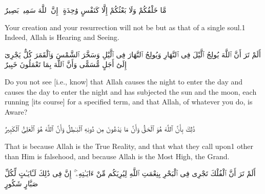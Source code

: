\begin{edition*}
	\begin{Arabic}
		مَّا خَلْقُكُمْ وَلَا بَعْثُكُمْ إِلَّا كَنَفْسٍ وَٰحِدَةٍ ۗ إِنَّ ٱللَّهَ سَمِيعٌۢ بَصِيرٌ
	\end{Arabic}
\end{edition*}

\begin{translation}
	Your creation and your resurrection will not be but as that of a single soul.1 Indeed, Allah is Hearing and Seeing.
\end{translation}


\begin{edition*}
	\begin{Arabic}
		أَلَمْ تَرَ أَنَّ ٱللَّهَ يُولِجُ ٱلَّيْلَ فِى ٱلنَّهَارِ وَيُولِجُ ٱلنَّهَارَ فِى ٱلَّيْلِ وَسَخَّرَ ٱلشَّمْسَ وَٱلْقَمَرَ كُلٌّ يَجْرِىٓ إِلَىٰٓ أَجَلٍ مُّسَمًّى وَأَنَّ ٱللَّهَ بِمَا تَعْمَلُونَ خَبِيرٌ
	\end{Arabic}
\end{edition*}

\begin{translation}
	Do you not see [i.e., know] that Allah causes the night to enter the day and causes the day to enter the night and has subjected the sun and the moon, each running [its course] for a specified term, and that Allah, of whatever you do, is Aware?
\end{translation}


\begin{edition*}
	\begin{Arabic}
		ذَٰلِكَ بِأَنَّ ٱللَّهَ هُوَ ٱلْحَقُّ وَأَنَّ مَا يَدْعُونَ مِن دُونِهِ ٱلْبَـٰطِلُ وَأَنَّ ٱللَّهَ هُوَ ٱلْعَلِىُّ ٱلْكَبِيرُ
	\end{Arabic}
\end{edition*}

\begin{translation}
	That is because Allah is the True Reality, and that what they call upon1 other than Him is falsehood, and because Allah is the Most High, the Grand.
\end{translation}


\begin{edition*}
	\begin{Arabic}
		أَلَمْ تَرَ أَنَّ ٱلْفُلْكَ تَجْرِى فِى ٱلْبَحْرِ بِنِعْمَتِ ٱللَّهِ لِيُرِيَكُم مِّنْ ءَايَـٰتِهِۦٓ ۚ إِنَّ فِى ذَٰلِكَ لَـَٔايَـٰتٍ لِّكُلِّ صَبَّارٍ شَكُورٍ
	\end{Arabic}
\end{edition*}

